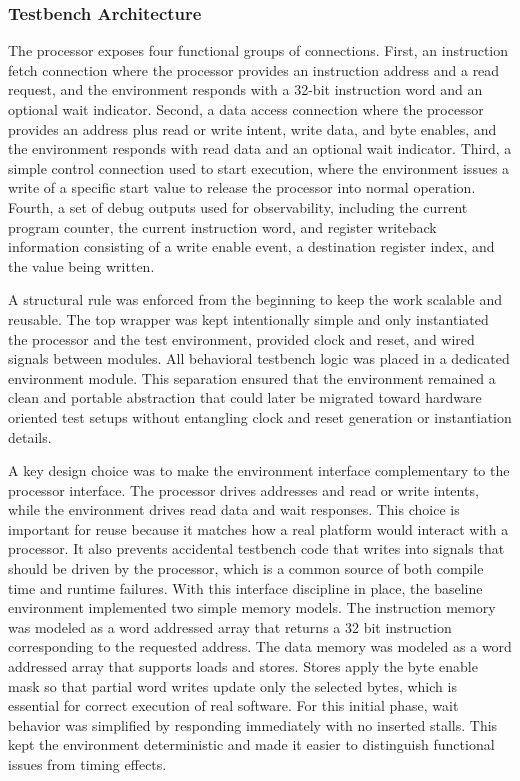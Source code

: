 \documentclass[12pt]{article}
\begin{document}
\subsubsection{Testbench Architecture}
The processor exposes four functional groups of connections. First, an instruction fetch connection where the processor provides an instruction address and a read request, and the environment responds with a 32-bit instruction word and an optional wait indicator. Second, a data access connection where the processor provides an address plus read or write intent, write data, and byte enables, and the environment responds with read data and an optional wait indicator. Third, a simple control connection used to start execution, where the environment issues a write of a specific start value to release the processor into normal operation. Fourth, a set of debug outputs used for observability, including the current program counter, the current instruction word, and register writeback information consisting of a write enable event, a destination register index, and the value being written.

A structural rule was enforced from the beginning to keep the work scalable and reusable. The top wrapper was kept intentionally simple and only instantiated the processor and the test environment, provided clock and reset, and wired signals between modules. All behavioral testbench logic was placed in a dedicated environment module. This separation ensured that the environment remained a clean and portable abstraction that could later be migrated toward hardware oriented test setups without entangling clock and reset generation or instantiation details.

A key design choice was to make the environment interface complementary to the processor interface. The processor drives addresses and read or write intents, while the environment drives read data and wait responses. This choice is important for reuse because it matches how a real platform would interact with a processor. It also prevents accidental testbench code that writes into signals that should be driven by the processor, which is a common source of both compile time and runtime failures. With this interface discipline in place, the baseline environment implemented two simple memory models. The instruction memory was modeled as a word addressed array that returns a 32 bit instruction corresponding to the requested address. The data memory was modeled as a word addressed array that supports loads and stores. Stores apply the byte enable mask so that partial word writes update only the selected bytes, which is essential for correct execution of real software. For this initial phase, wait behavior was simplified by responding immediately with no inserted stalls. This kept the environment deterministic and made it easier to distinguish functional issues from timing effects.
\end{document}
